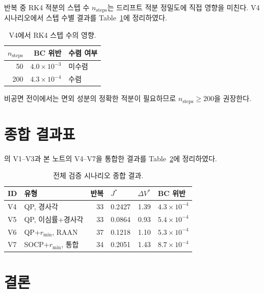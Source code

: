\documentclass[11pt]{article}
\begin{document}
반복 중 RK4 적분의 스텝 수 $n_{\mathrm{steps}}$는
드리프트 적분 정밀도에 직접 영향을 미친다.
V4 시나리오에서 스텝 수별 결과를 Table~\ref{tab:nsteps}에 정리하였다.

\begin{table}[h]
\centering
\caption{V4에서 RK4 스텝 수의 영향.}
\label{tab:nsteps}
\begin{tabular}{rrl}
\toprule
$n_{\mathrm{steps}}$ & BC 위반 & 수렴 여부 \\
\midrule
50  & $4.0 \times 10^{-3}$ & 미수렴 \\
200 & $4.3 \times 10^{-4}$ & 수렴 \\
\bottomrule
\end{tabular}
\end{table}

비공면 전이에서는 면외 성분의 정확한 적분이 필요하므로
$n_{\mathrm{steps}} \ge 200$을 권장한다.

\section{종합 결과표}

\cite{report008}의 V1--V3과 본 노트의 V4--V7을 통합한 결과를
Table~\ref{tab:summary}에 정리하였다.

\begin{table}[h]
\centering
\caption{전체 검증 시나리오 종합 결과.}
\label{tab:summary}
\begin{tabular}{llrlrl}
\toprule
ID & 유형 & 반복 & $J^*$ & $\Delta V^*$ & BC 위반 \\
\midrule
V4 & QP, 경사각 & 33 & 0.2427 & 1.39 & $4.3 \times 10^{-4}$ \\
V5 & QP, 이심률+경사각 & 33 & 0.0864 & 0.93 & $5.4 \times 10^{-4}$ \\
V6 & QP+$r_{\min}$, RAAN & 37 & 0.1218 & 1.10 & $5.3 \times 10^{-4}$ \\
V7 & SOCP+$r_{\min}$, 통합 & 34 & 0.2051 & 1.43 & $8.7 \times 10^{-4}$ \\
\bottomrule
\end{tabular}
\end{table}

\section{결론}
\end{document}
